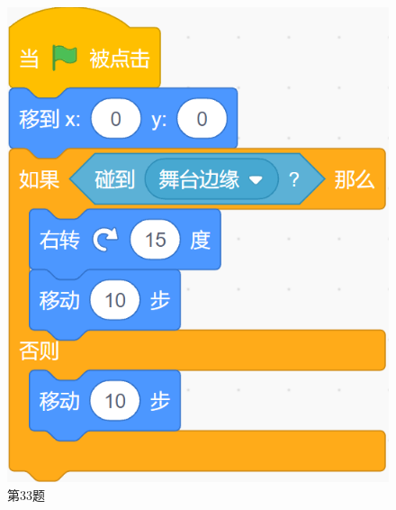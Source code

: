 \documentclass[10pt, a4paper]{article}
\begin{document}
\begin{enumerate}
\begin{figure}[htbp]
\begin{minipage}[t]{.15\textwidth}
                \centering
                \includegraphics[width=\textwidth]{33.png}
                \caption*{第33题}
            \end{minipage}
            \begin{minipage}[t]{.13\textwidth}
                \centering

\end{minipage}
\end{figure}
\end{enumerate}
\end{document}
